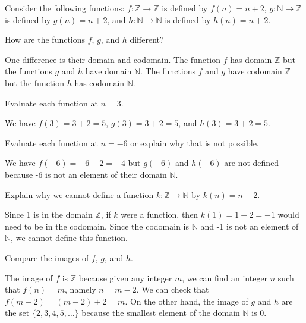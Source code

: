 \begin{exam}
\label{exam_diff_fns_same_rule}
    Consider the following functions: $f: \mathbb{Z} \to \mathbb{Z}$ is defined by $f(n) = n+2$, $g: \mathbb{N} \to \mathbb{Z}$ is defined by $g(n) = n+2$, and $h: \mathbb{N} \to \mathbb{N}$ is defined by $h(n) = n+2$.
        \begin{apart}
            \item How are the functions $f$, $g$, and $h$ different?
                \begin{soln}
                    One difference is their domain and codomain.  The function $f$ has domain $\mathbb{Z}$ but the functions $g$ and $h$ have domain $\mathbb{N}$.  The functions $f$ and $g$ have codomain $\mathbb{Z}$ but the function $h$ has codomain $\mathbb{N}$.
                \end{soln}
            \item Evaluate each function at $n=3$.
                \begin{soln}
                    We have $f(3) = 3+2 = 5$, $g(3) = 3+2 = 5$, and $h(3) = 3+2 = 5$.
                \end{soln}
            \item Evaluate each function at $n=-6$ or explain why that is not possible.
                \begin{soln}
                    We have $f(-6) = -6 + 2 = -4$ but $g(-6)$ and $h(-6)$ are not defined because -6 is not an element of their domain $\mathbb{N}$.
                \end{soln}
            \item Explain why we cannot define a function $k: \mathbb{Z} \to \mathbb{N}$ by $k(n) = n-2$.
                \begin{soln}
                    Since 1 is in the domain $\mathbb{Z}$, if $k$ were a function, then $k(1) = 1-2=-1$ would need to be in the codomain.  Since the codomain is $\mathbb{N}$ and -1 is not an element of $\mathbb{N}$, we cannot define this function.  
                \end{soln}
            \item Compare the images of $f$, $g$, and $h$.
                \begin{soln}
                    The image of $f$ is $\mathbb{Z}$ because given any integer $m$, we can find an integer $n$ such that $f(n) = m$, namely $n=m-2$.  We can check that $f(m-2) = (m-2)+2 = m$.  On the other hand, the image of $g$ and $h$ are the set $\{2, 3, 4, 5, \ldots\}$ because the smallest element of the domain $\mathbb{N}$ is 0.
                \end{soln}
        \end{apart}
\end{exam}

